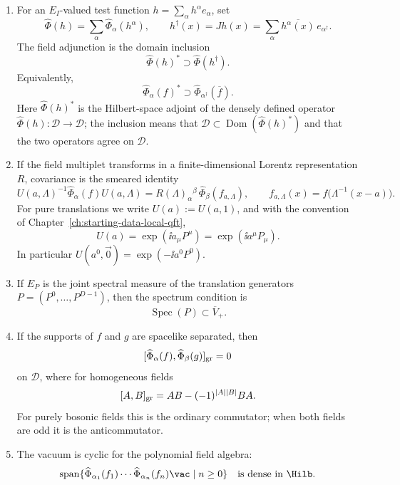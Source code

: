 \begin{definition}
\begin{enumerate}[label=\textup{(\roman*)}]
with common domain \(\mathcal D\).  Thus, for
\(f\in\mathcal S(M)\),
\[
  \widehat\Phi_\alpha(f)=
  \int_M \dd^D x\,f(x)\widehat\Phi_\alpha(x)
\]
means distributional pairing, and
\(\widehat\Phi_\alpha(f):\mathcal D\to\mathcal D\).  Matrix elements of finite
products between vectors in \(\mathcal D\) are continuous multilinear
functionals of the test functions.
\item For an \(E_I\)-valued test function
\(h=\sum_\alpha h^\alpha e_\alpha\), set
\[
  \widehat\Phi(h)=\sum_\alpha \widehat\Phi_\alpha(h^\alpha),
  \qquad
  h^\dagger(x)=Jh(x)
  =
  \sum_\alpha \overline{h^\alpha(x)}\,e_{\alpha^\dagger}.
\]
The field adjunction is the domain inclusion
\begin{equation}
  \widehat\Phi(h)^*\supset \widehat\Phi(h^\dagger).
  \label{eq:wightman-field-adjoint-inclusion}
\end{equation}
Equivalently,
\[
  \widehat\Phi_\alpha(f)^*
  \supset
  \widehat\Phi_{\alpha^\dagger}(\overline f).
\]
Here \(\widehat\Phi(h)^*\) is the Hilbert-space adjoint of the densely defined
operator \(\widehat\Phi(h):\mathcal D\to\mathcal D\); the inclusion means that
\(\mathcal D\subset\operatorname{Dom}(\widehat\Phi(h)^*)\) and that the two
operators agree on \(\mathcal D\).
\item If the field multiplet transforms in a finite-dimensional Lorentz
representation \(R\), covariance is the smeared identity
\[
  U(a,\Lambda)^{-1}\widehat\Phi_\alpha(f)U(a,\Lambda)
  =
  R(\Lambda)_\alpha{}^\beta\,
  \widehat\Phi_\beta(f_{a,\Lambda}),
  \qquad
  f_{a,\Lambda}(x)=f\bigl(\Lambda^{-1}(x-a)\bigr).
\]
For pure translations we write \(U(a):=U(a,1)\), and with the convention of
Chapter~\ref{ch:starting-data-local-qft},
\[
  U(a)=\exp(\ii a_\mu P^\mu)=\exp(\ii a^\mu P_\mu).
\]
In particular \(U(a^0,\vec0)=\exp(-\ii a^0P^0)\).
\item If \(E_P\) is the joint spectral measure of the translation generators
\(P=(P^0,\ldots,P^{D-1})\), then the spectrum condition is
\[
  \operatorname{Spec}(P)\subset \overline V_+ .
\]
\item If the supports of \(f\) and \(g\) are spacelike separated, then
\[
  [\widehat\Phi_\alpha(f),\widehat\Phi_\beta(g)]_{\rm gr}=0
\]
on \(\mathcal D\), where for homogeneous fields
\[
  [A,B]_{\rm gr}=AB-(-1)^{|A||B|}BA .
\]
For purely bosonic fields this is the ordinary commutator; when both fields
are odd it is the anticommutator.
\item The vacuum is cyclic for the polynomial field algebra:
\[
  \operatorname{span}\{
    \widehat\Phi_{\alpha_1}(f_1)\cdots
    \widehat\Phi_{\alpha_n}(f_n)\vac
    \mid n\ge0
  \}
  \quad\text{is dense in }\Hilb .
\]
\end{enumerate}
\end{definition}

